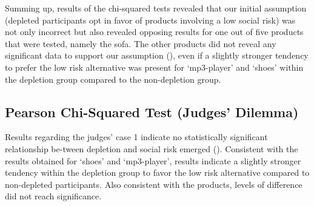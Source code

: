 Summing up, results of the chi-squared tests revealed that our initial assumption (depleted participants opt in favor of products involving a low social risk) was not only incorrect but also revealed opposing results for one out of five products that were tested, namely the sofa. The other products did not reveal any significant data to support our assumption (), even if a slightly stronger tendency to prefer the low risk alternative was present for ‘mp3-player’ and ‘shoes’ within the depletion group compared to the non-depletion group.\par
\FloatBarrier
\subsection{Pearson Chi-Squared Test (Judges’ Dilemma)}\label{sec:pearson_chi_judges}
Results regarding the judges’ case 1 indicate no statistically significant relationship be-tween depletion and social risk emerged (). Consistent with the results obtained for ‘shoes’ and ‘mp3-player’, results indicate a slightly stronger tendency within the depletion group to favor the low risk alternative compared to non-depleted participants. Also consistent with the products, levels of difference did not reach significance.

